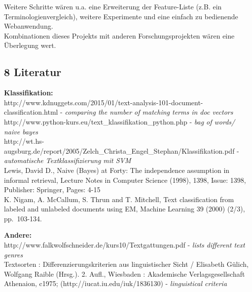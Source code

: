 \documentclass[]{article}
\begin{document}
Weitere Schritte wären u.a. eine Erweiterung der Feature-Liste (z.B. ein
Terminologienvergleich), weitere Experimente und eine einfach zu
bedienende Webanwendung.\\
Kombinationen dieses Projekts mit anderen Forschungsprojekten wären eine
Überlegung wert.

\subsection{8 Literatur}\label{literatur}

\textbf{Klassifikation:}\\
http://www.kdnuggets.com/2015/01/text-analysis-101-document-classification.html
- \emph{comparing the number of matching terms in doc vectors}\\
http://www.python-kurs.eu/text\_klassifikation\_python.php - \emph{bag
of words/ naive bayes}\\
http://wt.hs-augsburg.de/report/2005/Zelch\_Christa\_Engel\_Stephan/Klassifikation.pdf
- \emph{automatische Textklassifizierung mit SVM}\\
Lewis, David D., Naive (Bayes) at Forty: The independence assumption in
informal retrieval, Lecture Notes in Computer Science (1998), 1398,
Issue: 1398, Publisher: Springer, Pages: 4-15\\
K. Nigam, A. McCallum, S. Thrun and T. Mitchell, Text classification
from labeled and unlabeled documents using EM, Machine Learning 39
(2000) (2/3), pp.~103-134.

\textbf{Andere:}\\
http://www.falkwolfschneider.de/kurs10/Textgattungen.pdf - \emph{lists
different text genres}\\
Textsorten : Differenzierungskriterien aus linguistischer Sicht /
Elisabeth Gülich, Wolfgang Raible (Hrsg.). 2. Aufl., Wiesbaden :
Akademische Verlagsgesellschaft Athenaion, c1975;
(http://iucat.iu.edu/iuk/1836130) - \emph{linguistical criteria}
\end{document}
